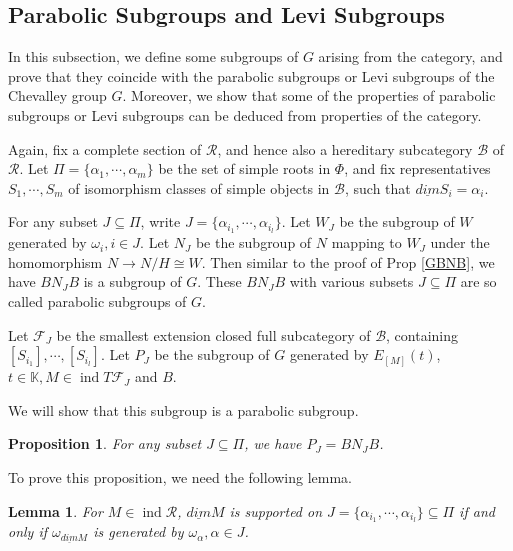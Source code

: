 \documentclass[12pt]{amsart}
\newtheorem{lemma}[theorem]{Lemma}
\newtheorem{proposition}[theorem]{Proposition}
\begin{document}
\subsection{Parabolic Subgroups and Levi Subgroups}

In this subsection, we define some subgroups of $G$ arising from the category, and prove that they coincide with the parabolic subgroups or Levi subgroups of the Chevalley group $G$.
Moreover, we show that some of the properties of parabolic subgroups or Levi subgroups can be deduced from properties of the category.

Again, fix a complete section of $\mathcal{R}$, and hence also a hereditary subcategory $\mathcal{B}$ of $\mathcal{R}$.
Let $\Pi = \{  \alpha_1,\cdots,\alpha_m \}$ be the set of simple roots in $\Phi$, 
and fix representatives $S_1,\cdots,S_m$ of isomorphism classes of simple objects in $\mathcal{B}$, such that $\underline{dim}S_i = \alpha_i$.

For any subset $J\subseteq  \Pi$, write $J = \{ \alpha_{i_1}, \cdots, \alpha_{i_l} \}$.
Let $W_J$ be the subgroup of $W$ generated by $\omega_i,i\in J$.
Let $N_J$ be the subgroup of $N$ mapping to $W_J$ under the homomorphism $N \rightarrow N/H \cong W$. 
Then similar to the proof of Prop \ref{GBNB}, we have $BN_J B$ is a subgroup of $G$.
These $BN_J B$ with various subsets $J\subseteq  \Pi$ are so called parabolic subgroups of $G$.

Let $\mathcal{F}_J$ be the smallest extension closed full subcategory of $\mathcal{B}$, containing $[S_{i_1}],\cdots, [S_{i_l}]$.
Let $P_J$ be the subgroup of $G$ generated by $E_{[M]}(t)$, $ t\in \mathbb{K},  M\in \operatorname{ind}T\mathcal{F}_J$ and $B$.

We will show that this subgroup is a parabolic subgroup.

\begin{proposition}\label{PJBNB}
    For any subset $J\subseteq \Pi$, we have $P_J = BN_J B$.
\end{proposition}

To prove this proposition, we need the following lemma.

\begin{lemma}\label{lemmaPJBNB}
    For $M\in \operatorname{ind}\mathcal{R}$, $\underline{dim}M $ is supported on $J= \{ \alpha_{i_1}, \cdots, \alpha_{i_l} \}\subseteq \Pi$ if and only if $\omega_{\underline{dim}M}$ is generated by $\omega_{\alpha},\alpha \in J$.
\end{lemma}
\end{document}
